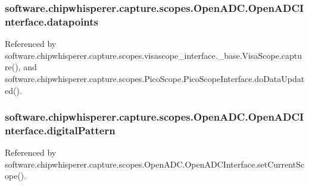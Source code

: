 \subsubsection[{datapoints}]{\setlength{\rightskip}{0pt plus 5cm}software.\+chipwhisperer.\+capture.\+scopes.\+Open\+A\+D\+C.\+Open\+A\+D\+C\+Interface.\+datapoints}\label{classsoftware_1_1chipwhisperer_1_1capture_1_1scopes_1_1OpenADC_1_1OpenADCInterface_ad81c68c704914ad92547e2d2106e79d2}


Referenced by software.\+chipwhisperer.\+capture.\+scopes.\+visascope\+\_\+interface.\+\_\+base.\+Visa\+Scope.\+capture(), and software.\+chipwhisperer.\+capture.\+scopes.\+Pico\+Scope.\+Pico\+Scope\+Interface.\+do\+Data\+Updated().

\hypertarget{classsoftware_1_1chipwhisperer_1_1capture_1_1scopes_1_1OpenADC_1_1OpenADCInterface_a6d125c97f6b5cf96af2c1abf78e04eca}{}
\subsubsection[{digital\+Pattern}]{\setlength{\rightskip}{0pt plus 5cm}software.\+chipwhisperer.\+capture.\+scopes.\+Open\+A\+D\+C.\+Open\+A\+D\+C\+Interface.\+digital\+Pattern}\label{classsoftware_1_1chipwhisperer_1_1capture_1_1scopes_1_1OpenADC_1_1OpenADCInterface_a6d125c97f6b5cf96af2c1abf78e04eca}


Referenced by software.\+chipwhisperer.\+capture.\+scopes.\+Open\+A\+D\+C.\+Open\+A\+D\+C\+Interface.\+set\+Current\+Scope().

\hypertarget{classsoftware_1_1chipwhisperer_1_1capture_1_1scopes_1_1OpenADC_1_1OpenADCInterface_af48a01832efa9ab4598aab4e50adf7f7}{}

